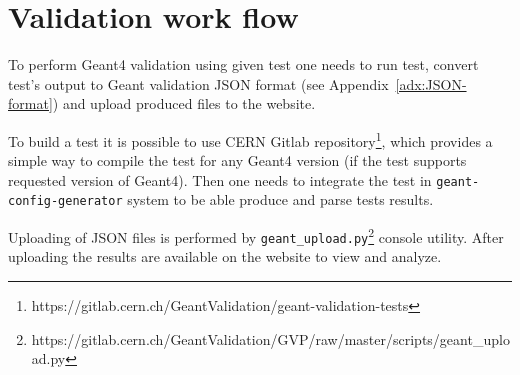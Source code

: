 \section{Validation work flow}
\label{sec-workflow}

To perform Geant4 validation using given test one needs to run test, convert test's output to Geant validation JSON format (see Appendix~\ref{adx:JSON-format}) and upload produced files to the website.

To build a test it is possible to use CERN Gitlab repository\footnote{https://gitlab.cern.ch/GeantValidation/geant-validation-tests}, which provides a simple way to compile the test for any Geant4 version (if the test supports requested version of Geant4).
Then one needs to integrate the test in {\tt geant-config-generator} system to be able produce and parse tests results.

Uploading of JSON files is performed by {\tt geant\_upload.py}\footnote{https://gitlab.cern.ch/GeantValidation/GVP/raw/master/scripts/geant\_upload.py} console utility.
After uploading the results are available on the website to view and analyze.